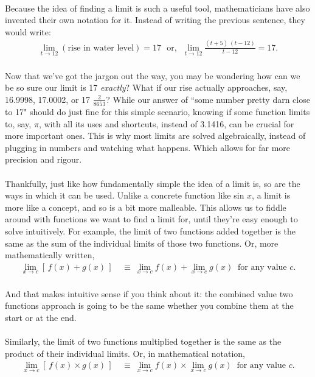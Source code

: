 \documentclass[11pt]{article}
\numberwithin{equation}{section}
\begin{document}
\\ Because the idea of finding a limit is such a useful tool, mathematicians have also invented their own notation for it. Instead of writing the previous sentence, they would write:
\begin{align*}
\lim_{t \to 12} \left(\textrm{rise in water level}\right) = 17 \ \ \ \textrm{or,} \ \ \ \lim_{t \to 12} \frac{(t + 5) \ (t - 12)}{t - 12} = 17.
\end{align*}
\\ Now that we've got the jargon out the way, you may be wondering how can we be so sure our limit is 17 \textit{exactly}? What if our rise actually approaches, say, 16.9998, 17.0002, or 17 \(\frac{2}{8653}\)? While our answer of ``some number pretty darn close to 17" should do just fine for this simple scenario, knowing if some function limits to, say, \(\pi\), with all its uses and shortcuts, instead of 3.1416, can be crucial for more important ones. This is why most limits are solved algebraically, instead of plugging in numbers and watching what happens. Which allows for far more precision and rigour.  
\\ \\ Thankfully, just like how fundamentally simple the idea of a limit is, so are the ways in which it can be used. Unlike a concrete function like sin \(x\), a limit is more like a concept, and so is a bit more malleable. This allows us to fiddle around with functions we want to find a limit for, until they're easy enough to solve intuitively. For example, the limit of two functions added together is the same as the sum of the individual limits of those two functions. Or, more mathematically written,
\begin{align*}
\lim_{x \to c} \left[ \, f(x) + g(x) \, \right] \ &\equiv \ \lim_{x \to c} f(x) + \lim_{x \to c} g(x) \ \textrm{ for any value } c.
\end{align*}
\\ And that makes intuitive sense if you think about it: the combined value two functions approach is going to be the same whether you combine them at the start or at the end.
\\ \\ Similarly, the limit of two functions multiplied together is the same as the product of their individual limits. Or, in mathematical notation,
\begin{align*}
\lim_{x \to c} \left[ \, f(x) \times g(x) \, \right] \ &\equiv \ \lim_{x \to c} f(x) \times \lim_{x \to c} g(x) \ \textrm{ for any value } c.
\end{align*}
\end{document}
